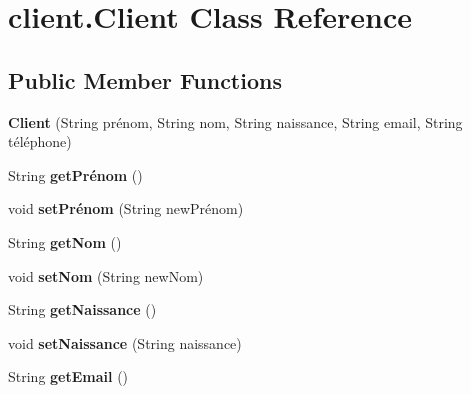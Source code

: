 \hypertarget{classclient_1_1_client}{}\section{client.\+Client Class Reference}
\label{classclient_1_1_client}
\subsection*{Public Member Functions}
\begin{DoxyCompactItemize}
\item 
{\bfseries Client} (String prénom, String nom, String naissance, String email, String téléphone)\hypertarget{classclient_1_1_client_a352ae7e985dcc272944f41c630b19826}{}\label{classclient_1_1_client_a352ae7e985dcc272944f41c630b19826}

\item 
String {\bfseries get\+Prénom} ()\hypertarget{classclient_1_1_client_a10fca5d94349a6151b6195601790ed37}{}\label{classclient_1_1_client_a10fca5d94349a6151b6195601790ed37}

\item 
void {\bfseries set\+Prénom} (String new\+Prénom)\hypertarget{classclient_1_1_client_a67ef67b287f2effd22de1f950642e80c}{}\label{classclient_1_1_client_a67ef67b287f2effd22de1f950642e80c}

\item 
String {\bfseries get\+Nom} ()\hypertarget{classclient_1_1_client_adec45a786879acb72cc17e51e76c7373}{}\label{classclient_1_1_client_adec45a786879acb72cc17e51e76c7373}

\item 
void {\bfseries set\+Nom} (String new\+Nom)\hypertarget{classclient_1_1_client_ae3bd099337c8a316dabd27a61c015417}{}\label{classclient_1_1_client_ae3bd099337c8a316dabd27a61c015417}

\item 
String {\bfseries get\+Naissance} ()\hypertarget{classclient_1_1_client_a3a24e5a788a996e25b846caf118c337f}{}\label{classclient_1_1_client_a3a24e5a788a996e25b846caf118c337f}

\item 
void {\bfseries set\+Naissance} (String naissance)\hypertarget{classclient_1_1_client_a0cedd76dbca326eb449364bc74db17e4}{}\label{classclient_1_1_client_a0cedd76dbca326eb449364bc74db17e4}

\item 
String {\bfseries get\+Email} ()\hypertarget{classclient_1_1_client_a95d46988c8ea55add69f98057a1fb471}{}\label{classclient_1_1_client_a95d46988c8ea55add69f98057a1fb471}


\end{DoxyCompactItemize}
